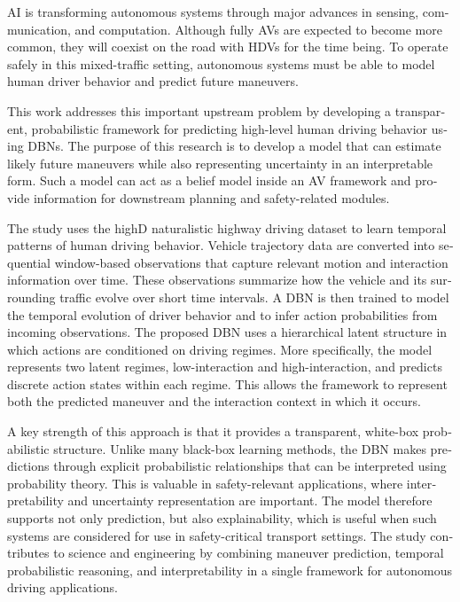 \begin{otherlanguage}{english}

\ac{AI} is transforming autonomous systems through major advances in sensing, communication, and computation. Although fully \acp{AV} are expected to become more common, they 
will coexist on the road with \acp{HDV} for the time being. To operate safely in this mixed-traffic setting, autonomous systems must be able to model human driver behavior 
and predict future maneuvers.

\par This work addresses this important upstream problem by developing a transparent, probabilistic framework for predicting high-level human driving behavior using \acp{DBN}. 
The purpose of this research is to develop a model that can estimate likely future maneuvers while also representing uncertainty in an interpretable form. Such a model can act as 
a belief model inside an \ac{AV} framework and provide information for downstream planning and safety-related modules.

\par The study uses the highD naturalistic highway driving dataset to learn temporal patterns of human driving behavior. Vehicle trajectory data are converted into sequential 
window-based observations that capture relevant motion and interaction information over time. These observations summarize how the vehicle and its surrounding traffic evolve
 over short time intervals. A \ac{DBN} is then trained to model the temporal evolution of driver behavior and to infer action probabilities from incoming observations. 
 The proposed \ac{DBN} uses a hierarchical latent structure in which actions are conditioned on driving regimes. More specifically, the model represents two latent regimes, 
 low-interaction and high-interaction, and predicts discrete action states within each regime. This allows the framework to represent both the predicted maneuver and the interaction 
 context in which it occurs. 

\par A key strength of this approach is that it provides a transparent, white-box probabilistic structure. Unlike many black-box learning methods, the \ac{DBN} makes predictions
 through explicit probabilistic relationships that can be interpreted using probability theory. This is valuable in safety-relevant applications, where interpretability and 
 uncertainty representation are important. The model therefore supports not only prediction, but also explainability, which is useful when such systems are considered for use 
 in safety-critical transport settings. The study contributes to science and engineering by combining maneuver prediction, temporal probabilistic reasoning, and interpretability 
 in a single framework for autonomous driving applications.


\end{otherlanguage}
